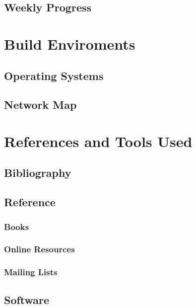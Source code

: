 \documentclass[a4paper,12pt]{report}
\begin{document}
\section{Weekly Progress}


\chapter{Build Enviroments}

\section{Operating Systems}



\section{Network Map}




\chapter{References and Tools Used}

\section{Bibliography}

\section{Reference}

%

\subsection{Books}



\subsection{Online Resources}



\subsection{Mailing Lists}

%

\section{Software}


\end{document}
